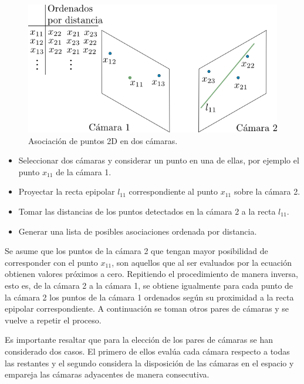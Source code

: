 \begin{figure}[ht!]
\begin{center}
\includegraphics[scale=0.4]{../imagenes/Reconstruccion/geometria_epipolar.png}
\caption{Asociación de puntos 2D en dos cámaras.}
\label{fig: cam2cam }
\end{center}
\end{figure}

\begin{itemize}

\item Seleccionar dos cámaras y considerar un punto en una de ellas, por ejemplo el punto $x_{11}$ de la cámara 1.
\item Proyectar la recta epipolar $l_{11}$ correspondiente al punto $x_{11}$ sobre la cámara 2.
\item Tomar las distancias de los puntos detectados en la cámara 2 a la recta $l_{11}$.
\item Generar una lista de posibles asociaciones ordenada por distancia.
\end{itemize}
Se asume que los puntos de la cámara 2 que tengan mayor posibilidad de corresponder con el punto $x_{11}$, son aquellos que al ser evaluados por la ecuación obtienen valores próximos a cero.
Repitiendo el procedimiento de manera inversa, esto es, de la cámara 2 a la cámara 1, se obtiene igualmente para cada punto de la cámara 2  los puntos de la cámara 1 ordenados según su proximidad a la recta epipolar correspondiente. A continuación se toman otros pares de cámaras y se vuelve a repetir el proceso. 

Es importante resaltar que para la elección de los pares de cámaras se han considerado dos casos.
El primero de ellos evalúa cada cámara respecto a todas las restantes y el segundo considera la disposición de las cámaras en el espacio y empareja las cámaras adyacentes de manera consecutiva.

